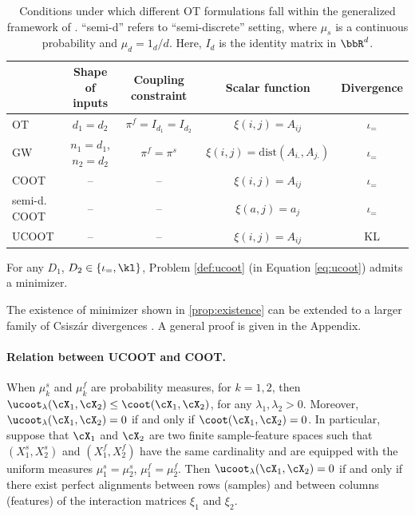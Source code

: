 \begin{table}[t]
  \centering
  \small
  \begin{tabular}{l *4c}
      \toprule
          & Shape of inputs & Coupling constraint & Scalar function & Divergence \\
      \midrule
      OT   & $d_1 = d_2$              & $\pi^f = I_{d_1} = I_{d_2}$ & $\xi(i, j) = A_{ij}$                        & $\iota_=$ \\
      GW   & $n_1 = d_1$, $n_2 = d_2$ & $\pi^f = \pi^s$             & $\xi(i, j) = \text{dist}( A_{i.}, A_{j.} )$ & $\iota_=$ \\
      COOT & --                       & --                          & $\xi(i, j) = A_{ij}$                        & $\iota_=$ \\
      semi-d. COOT & --               & --                          & $\xi(a, j) = a_j$                           & $\iota_=$ \\
      UCOOT & --                      & --                          & $\xi(i, j) = A_{ij}$                        & KL \\
        \bottomrule
        \hline
        \end{tabular}
        \caption{Conditions under which different OT formulations fall within
        the generalized framework of .
        ``semi-d'' refers to ``semi-discrete'' setting, where
        $\mu_s$ is a continuous probability and $\mu_d = 1_d/d$.
        Here, $I_d$ is the identity matrix in $\bbR^d$.
  \label{t:examples}}
\end{table}
\begin{proposition} \label{prop:existence}
For any $D_1$, $D_2 \in \{ \iota_{=}, \kl \}$, Problem \ref{def:ucoot} (in Equation \ref{eq:ucoot})
admits a minimizer.
\end{proposition}

\begin{remark}
The existence of minimizer shown in \cref{prop:existence}
can be extended to a larger family of Csiszár divergences \citep{Csiszar63}.
A general proof is given in the Appendix.
\end{remark}

\paragraph{Relation between UCOOT and COOT.} When $ \mu^s_k$ and $\mu^f_k$ are probability measures,
for $k=1,2$, then $\ucoot_{\lambda}(\cX_1, \cX_2) \leq \coot(\cX_1, \cX_2)$,
for any $\lambda_1, \lambda_2 > 0$.
Moreover, $\ucoot_{\lambda}(\cX_1, \cX_2) = 0$ if and only if $\coot(\cX_1, \cX_2) = 0$.
In particular, suppose that $\cX_1$ and $\cX_2$ are two finite sample-feature spaces
such that $(X^s_1, X^s_2)$ and $(X^f_1, X^f_2)$ have the same cardinality and
are equipped with the uniform measures $\mu_1^s = \mu_2^s$, $\mu_1^f = \mu_2^f$.
Then $\ucoot_{\lambda}(\cX_1, \cX_2) = 0$ if and only if
there exist perfect alignments between rows (samples) and between
columns (features) of the interaction matrices $\xi_1$ and $\xi_2$.

